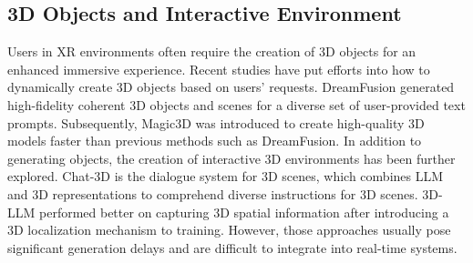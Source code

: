 \subsection{3D Objects and Interactive Environment}
Users in XR environments often require the creation of 3D objects for an enhanced immersive experience. Recent studies have put efforts into how to dynamically create 3D objects based on users' requests.
DreamFusion \cite{poole2022dreamfusion} generated high-fidelity coherent 3D objects and scenes for a diverse set of user-provided text prompts. Subsequently, Magic3D \cite{lin2023magic3d} was introduced to create high-quality 3D models faster than previous methods such as DreamFusion. In addition to generating objects, the creation of interactive 3D environments has been further explored. Chat-3D \cite{wang2023chat} is the dialogue system for 3D scenes, which combines LLM and 3D representations to comprehend diverse instructions for 3D scenes. 3D-LLM \cite{hong20233d} performed better on capturing 3D spatial information after introducing a 3D localization mechanism to training. However, those approaches usually pose significant generation delays and are difficult to integrate into real-time systems.